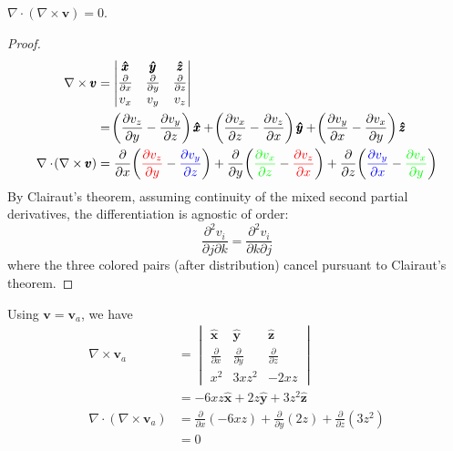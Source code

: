 \documentclass[a4paper]{article}
\begin{document}

\( \nabla \cdot \!\left( \nabla \times \pmb{v} \right) = 0 \).

\begin{proof}[Proof]
\begin{align*}
	\nabla \times \pmb{v} & = \begin{vmatrix}
		\pmb{\hat{x}} & \pmb{\hat{y}} & \pmb{\hat{z}} \\
		\frac{\partial }{\partial x} & \frac{\partial }{\partial y} & \frac{\partial }{\partial z} \\
		v_{x} & v_{y} & v_{z}
	\end{vmatrix} \\
	 & = \!\left( \frac{\partial v_{z}}{\partial y} - \frac{\partial v_{y}}{\partial z} \right)\pmb{\hat{x}} + \!\left( \frac{\partial v_{x}}{\partial z} - \frac{\partial v_{z}}{\partial x} \right)\pmb{\hat{y}} + \!\left( \frac{\partial v_{y}}{\partial x} - \frac{\partial v_{x}}{\partial y} \right)\pmb{\hat{z}} \\ 
		\nabla \cdot \!\left( \nabla \times \pmb{v} \right) & = \frac{\partial }{\partial x}\!\left( \textcolor{red}{\frac{\partial v_{z}}{\partial y}} - \textcolor{blue}{\frac{\partial v_{y}}{\partial z}} \right) + \frac{\partial }{\partial y}\!\left( \textcolor{green}{\frac{\partial v_{x}}{\partial z}} - \textcolor{red}{\frac{\partial v_{z}}{\partial x}} \right) + \frac{\partial }{\partial z}\!\left( \textcolor{blue}{\frac{\partial v_{y}}{\partial x}} - \textcolor{green}{\frac{\partial v_{x}}{\partial y}} \right)
\end{align*}
By Clairaut's theorem, assuming continuity of the mixed second partial derivatives, the differentiation is agnostic of order:
\[
	\frac{\partial^{2} v_{i}}{\partial j \partial k} = \frac{\partial^{2} v_{i}}{\partial k \partial j} 
\]
where the three colored pairs (after distribution) cancel pursuant to Clairaut's theorem. 
\end{proof}
Using \( \pmb{v} = \pmb{v}_{a} \), we have
\begin{align*}
	\nabla \times \pmb{v}_{a} & = \begin{vmatrix}
		\pmb{\hat{x}} & \pmb{\hat{y}} & \pmb{\hat{z}} \\
		\frac{\partial }{\partial x} & \frac{\partial }{\partial y} & \frac{\partial }{\partial z} \\
		x^{2} & 3xz^{2} & -2xz
	\end{vmatrix} \\
	 & = -6xz \pmb{\hat{x}} + 2z \pmb{\hat{y}} + 3z^{2}\pmb{\hat{z}} \\ 
		\nabla \cdot \!\left( \nabla \times \pmb{v}_{a} \right) & = \frac{\partial }{\partial x}\!\left( -6xz \right) + \frac{\partial }{\partial y}\!\left( 2z \right) + \frac{\partial }{\partial z}\!\left( 3z^{2} \right) \\
									& = 0
\end{align*}
\end{document}
